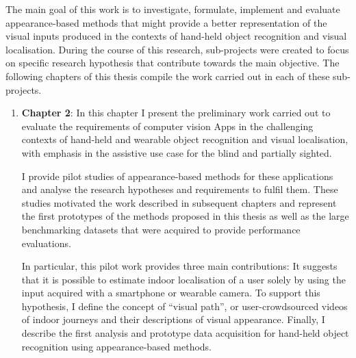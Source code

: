 The main goal of this work is to investigate, formulate, implement and evaluate appearance-based methods that might provide a better representation of the visual inputs produced in the contexts of hand-held object recognition and visual localisation. During the course of this research, sub-projects were created to focus on specific research hypothesis that contribute towards the main objective. The following chapters of this thesis compile the work carried out in each of these sub-projects.


\begin{enumerate}

\item \textbf{Chapter 2}: In this chapter I present the preliminary work carried out to evaluate the requirements of computer vision Apps in the challenging contexts of hand-held and wearable object recognition and visual localisation, with emphasis in the assistive use case for the blind and partially sighted. %

I provide pilot studies of appearance-based methods for these applications and analyse the research hypotheses and requirements to fulfil them. These studies motivated the work described in subsequent chapters and represent the first prototypes of the methods proposed in this thesis as well as the large benchmarking datasets that were acquired to provide performance evaluations.

In particular, this pilot work provides three main contributions: It suggests that it is possible to estimate indoor localisation of a user solely by using the input acquired with a smartphone or wearable camera. To support this hypothesis, I define the concept of ``visual path'', or user-crowdsourced videos of indoor journeys and their descriptions of visual appearance. Finally, I describe the first analysis and prototype data acquisition for hand-held object recognition using appearance-based methods.



\end{enumerate}
